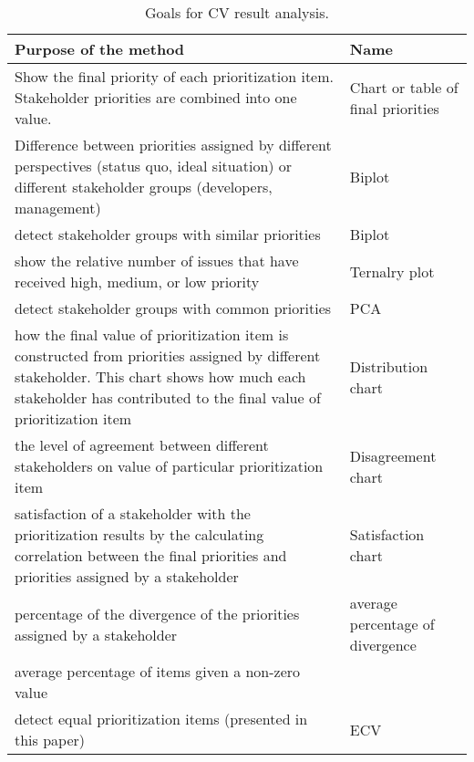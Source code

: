 \begin{table}
	\scriptsize
\caption{Goals for CV result analysis.}
\label{goals_for_methods}

\begin{tabular}{|>{\raggedright}p{}|>{\raggedright}p{}|}
\hline 
Purpose of the method & Name\tabularnewline
\hline

Show the final priority of each prioritization item. Stakeholder priorities
are combined into one value. & 
Chart or table of final priorities\tabularnewline
\hline 

Difference between priorities assigned by different perspectives (status
quo, ideal situation) or different stakeholder groups (developers,
management) \citep{Chatzipetrou2010}& 
Biplot \tabularnewline
\hline 

detect stakeholder groups with similar priorities \citep{Chatzipetrou2010}& Biplot \tabularnewline
\hline 

show the relative number of issues that have received high, medium,
or low priority \citep{Chatzipetrou2010}& Ternalry plot \tabularnewline
\hline 

detect stakeholder groups with common priorities \citep{Chatzipetrou2010}& PCA \tabularnewline
\hline 

how the final value of prioritization item is constructed from priorities
assigned by different stakeholder. This chart shows how much each
stakeholder has contributed to the final value of prioritization item \citep{Regnell2000}& Distribution chart  \tabularnewline
\hline 

the level of agreement between different stakeholders on value of
particular prioritization item \citep{Regnell2000} & 
Disagreement chart  \tabularnewline
\hline 

satisfaction of a stakeholder with the prioritization results by the
calculating correlation between the final priorities and priorities
assigned by a stakeholder \citep{Regnell2000}& 
Satisfaction chart\tabularnewline
\hline 

percentage of the divergence of the priorities assigned by a stakeholder \citep{Berander2006a} & 
average percentage of divergence\tabularnewline
\hline 
average percentage of items given a non-zero value \citep{Berander2006a} & \tabularnewline
\hline 

detect equal prioritization items (presented in this paper)& 
ECV \tabularnewline
\hline
\end{tabular}
\end{table}

